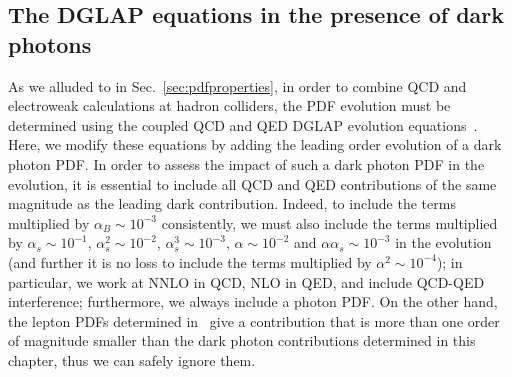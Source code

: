 \documentclass[withindex,glossary]{cam-thesis}
\begin{document}
\subsection{The DGLAP equations in the presence of dark photons}
\label{subsec:dglap}


As we alluded to in Sec.~\ref{sec:pdfproperties}, in order to combine  QCD and electroweak
calculations at hadron colliders,
the PDF evolution must be determined using the coupled QCD and QED
DGLAP
evolution
equations~\cite{DeRujula:1979grv,Kripfganz:1988bd,Blumlein:1989gk}.
Here, we modify these equations by adding the leading order evolution of a dark photon PDF. 
%
In order to assess the impact of such a dark photon PDF in the
evolution, it is essential to include all QCD and QED contributions
of the same magnitude as the leading dark contribution. Indeed, to
include the terms multiplied by $\alpha_B \sim 10^{-3}$ consistently,
we must also include the terms multiplied by $\alpha_s \sim 10^{-1}$,
$\alpha_s^2 \sim 10^{-2}$, $\alpha_s^3 \sim 10^{-3}$, $\alpha \sim
10^{-2}$ and $\alpha\alpha_s \sim 10^{-3}$
in the evolution (and further it is no loss to include the terms
multiplied by $\alpha^2 \sim 10^{-4}$);
in particular, we work at NNLO in QCD, NLO in QED, and include QCD-QED
interference;
furthermore, we always include a photon PDF. On the other hand, the
lepton PDFs determined
in~\cite{Buonocore:2020erb,Buonocore:2020nai,Buonocore:2021bsf,Harland-Lang:2021zvr}
give a contribution that is more than one order of magnitude smaller
than the dark photon
contributions determined in this chapter, thus we can safely ignore them.
\end{document}
